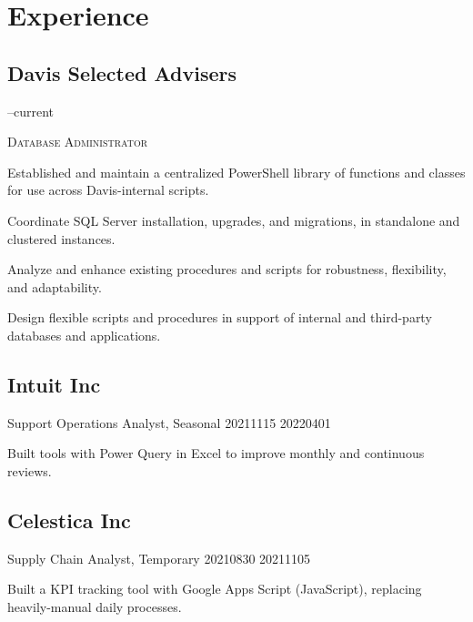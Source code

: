 \vspace{-\topskip}
\section{Experience}
\subsection{Davis Selected Advisers}
\vspace{1ex}
\begin{minipage}[t]{0.245\textwidth}
    \vspace{-\topskip}
    {\hspace{.25em}}\footnotesize\textsf{--current}
\end{minipage}
\hfill
\begin{minipage}[t]{0.75\textwidth}
    \vspace{-\topskip}
    {\scshape\textsf{Database Administrator}
    }\\
    \setlength{\parskip}{0.7em}
    \setlength{\baselineskip}{2.6ex}

    Established and maintain a centralized PowerShell library of functions and
    classes for use across Davis-internal scripts.

    Coordinate SQL Server installation, upgrades, and migrations, in standalone
    and clustered instances.

    Analyze and enhance existing procedures and scripts for
    robustness, flexibility, and adaptability.

    Design flexible scripts and procedures in support of internal and
    third-party databases and applications.


    {
}
\end{minipage}
\vspace{0ex}

\subsection{Intuit Inc}
\experienceitem
    {Support Operations Analyst, Seasonal}
    {2021}{11}{15}
    {2022}{04}{01}
    {
        Built tools with Power Query in Excel to improve monthly and continuous
        reviews.

}

\subsection{Celestica Inc}
\experienceitem
    {Supply Chain Analyst, Temporary
    }
    {2021}{08}{30}
    {2021}{11}{05}{

    Built a KPI tracking tool with Google Apps Script (JavaScript), replacing
    heavily-manual daily processes.
    }

